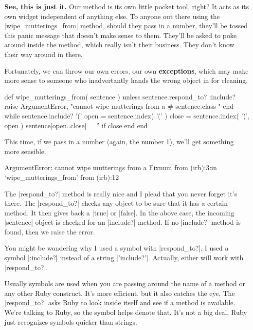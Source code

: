 \documentclass[12pt,twoside]{report}
\begin{document}
{\bf See, this is just it.}  Our method is its own little pocket tool,
right?  It acts as its own widget independent of anything else.  To
anyone out there using the
\rubyinline|wipe_mutterings_from| method, should they
pass in a number, they'll be tossed this panic message that doesn't
make sense to them.  They'll be asked to poke around inside the
method, which really isn't their business.  They don't know their way
around in there.

Fortunately, we can throw our own errors, our own {\bf exceptions},
which may make more sense to someone who inadvertantly hands the wrong
object in for cleaning.


\begin{rubycode}

 def wipe_mutterings_from( sentence )
   unless sentence.respond_to? :include?
     raise ArgumentError,
       "cannot wipe mutterings from a #{ sentence.class }"
   end
   while sentence.include? '('
     open = sentence.index( '(' )
     close = sentence.index( ')', open )
     sentence[open..close] = '' if close
   end
 end

\end{rubycode}


This time, if we pass in a number (again, the number 1), we'll get
something more sensible.


\begin{consolecode}

 ArgumentError: cannot wipe mutterings from a Fixnum
         from (irb):3:in `wipe_mutterings_from'
         from (irb):12

\end{consolecode}


The \rubyinline|respond_to?| method is really nice and
I plead that you never forget it's there.  The
\rubyinline|respond_to?| checks any object to be sure
that it has a certain method.  It then gives back a
\rubyinline|true| or
\rubyinline|false|.  In the above case, the incoming
\rubyinline|sentence| object is checked for an
\rubyinline|include?| method.  If no
\rubyinline|include?| method is found, then we raise
the error.

You might be wondering why I used a symbol with
\rubyinline|respond_to?|.  I used a symbol
\rubyinline|:include?| instead of a string
\rubyinline|'include?'|.  Actually, either will work
with \rubyinline|respond_to?|.

Usually symbols are used when you are passing around the name of a
method or any other Ruby construct. It's more efficient, but it also
catches the eye.  The \rubyinline|respond_to?| asks
Ruby to look inside itself and see if a method is available.  We're
talking to Ruby, so the symbol helps denote that.  It's not a big
deal, Ruby just recognizes symbols quicker than strings.
\end{document}
